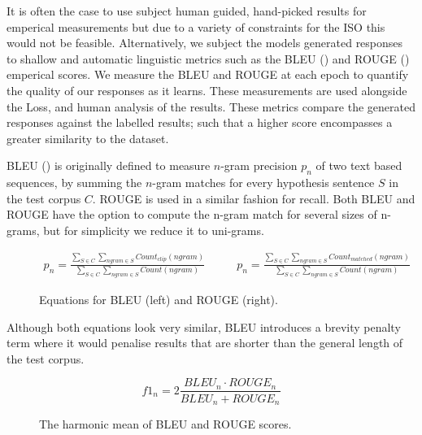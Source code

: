 \documentclass[12pt,twoside]{report}
\begin{document}
It is often the case to use subject human guided, hand-picked results for emperical measurements but due to a variety of constraints for the ISO this would not be feasible. Alternatively, we subject the models generated responses to shallow and automatic linguistic metrics such as the BLEU (\cite{papineni_bleu:_2001}) and ROUGE (\cite{lin_rouge:_2004}) emperical scores. We measure the BLEU and ROUGE at each epoch to quantify the quality of our responses as it learns. These measurements are used alongside the Loss, and human analysis of the results. These metrics compare the generated responses against the labelled results; such that a higher score encompasses a greater similarity to the dataset.

BLEU (\cite{papineni_bleu:_2001}) is originally defined to measure $n$-gram precision $p_n$ of two text based sequences, by summing the $n$-gram matches for every hypothesis sentence $S$ in the test corpus $C$. ROUGE is used in a similar fashion for recall. Both BLEU and ROUGE have the option to compute the n-gram match for several sizes of n-grams, but for simplicity we reduce it to uni-grams.

\begin{figure}[!ht]
	\begin{equation}
		\begin{split}
			p_n = \frac
			{\sum_{S\in C} \sum_{ngram\in S} Count_{clip}(ngram)}
			{\sum_{S\in C} \sum_{ngram\in S} Count(ngram)}
		\end{split}
		\quad\quad
		\begin{split}
			p_n = \frac
			{\sum_{S\in C} \sum_{ngram\in S} Count_{matched}(ngram)}
			{\sum_{S\in C} \sum_{ngram\in S} Count(ngram)}
		\end{split}
	\end{equation}
	\caption{Equations for BLEU (left) and ROUGE (right).}
	\end{figure}

Although both equations look very similar, BLEU introduces a brevity penalty term where it would penalise results that are shorter than the general length of the test corpus.

\begin{figure}[!ht]
	\begin{equation}
		f1_{n} = 2 \frac{BLEU_n \cdot ROUGE_n}{BLEU_n + ROUGE_n}
	\end{equation}
	\caption{The harmonic mean of BLEU and ROUGE scores.}
	\label{f1}
\end{figure}
\end{document}
